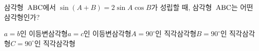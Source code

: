 삼각형~$\mathrm{ABC}$에서 $\sin(A+B)=2\sin A\cos B$가 성립할 때, 삼각형~$\mathrm{ABC}$는 어떤 삼각형인가?
\begin{choicesv}{$a=b$인 이등변삼각형}{$a=c$인 이등변삼각형}{$A=90^\circ$인 직각삼각형}{$B=90^\circ$인 직각삼각형}{$C=90^\circ$인 직각삼각형}\end{choicesv}
